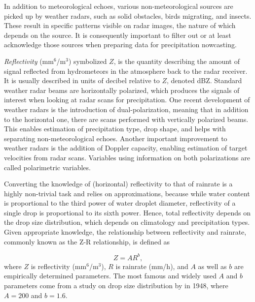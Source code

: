 In addition to meteorological echoes, various non-meteorological sources are picked up by weather radars, such as solid obstacles, birds migrating, and insects. These result in specific patterns visible on radar images, the nature of which depends on the source. It is consequently important to filter out or at least acknowledge those sources when preparing data for precipitation nowcasting. \cite{fabry_radar_2018}


\textit{Reflectivity} (mm$^{6}$/m$^{3}$) symbolized $Z$, is the quantity describing the amount of signal reflected from hydrometeors in the atmosphere back to the radar receiver. It is usually described in units of decibel relative to $Z$, denoted dBZ. Standard weather radar beams are horizontally polarized, which produces the signals of interest when looking at radar scans for precipitation. One recent development of weather radars is the introduction of dual-polarization, meaning that in addition to the horizontal one, there are scans performed with vertically polarized beams. This enables estimation of precipitation type, drop shape, and helps with separating non-meteorological echoes. Another important improvement to weather radars is the addition of Doppler capacity, enabling estimation of target velocities from radar scans. Variables using information on both polarizations are called polarimetric variables.


Converting the knowledge of (horizontal) reflectivity to that of rainrate is a highly non-trivial task and relies on approximations, because while water content is proportional to the third power of water droplet diameter, reflectivity of a single drop is proportional to its sixth power. Hence, total reflectivity depends on the drop size distribution, which depends on climatology and precipitation types. Given appropriate knowledge, the relationship between reflectivity and rainrate, commonly known as the Z-R relationship, is defined as  

\begin{equation}
\label{eq:z-r}
	Z = AR^b,
\end{equation}
where $Z$ is reflectivity (mm$^{6}$/m$^{3}$), $R$ is rainrate (mm/h), and $A$ as well as $b$ are empirically determined parameters. The most famous and widely used $A$ and $b$ parameters come from a study on drop size distribution by \citet{marshall1948size} in 1948, where $A=200$ and $b=1.6$.


